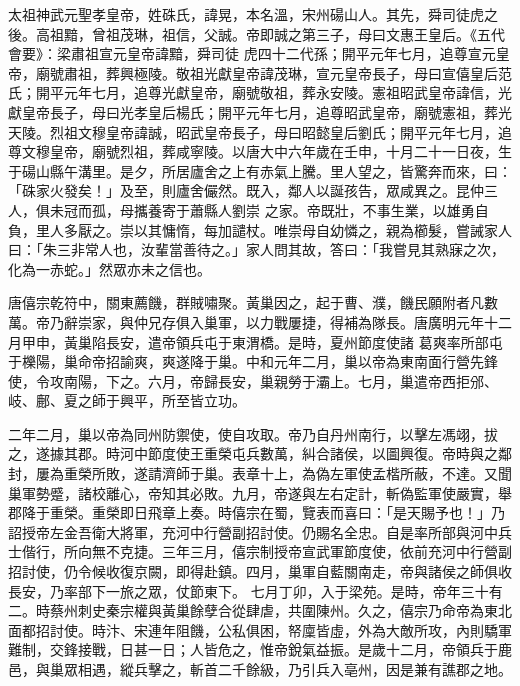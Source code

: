 
\begin{pinyinscope}

 太祖神武元聖孝皇帝，姓硃氏，諱晃，本名溫，宋州碭山人。其先，舜司徒虎之後。高祖黯，曾祖茂琳，祖信，父誠。帝即誠之第三子，母曰文惠王皇后。《五代會要》：梁肅祖宣元皇帝諱黯，舜司徒
 虎四十二代孫；開平元年七月，追尊宣元皇帝，廟號肅祖，葬興極陵。敬祖光獻皇帝諱茂琳，宣元皇帝長子，母曰宣僖皇后范氏；開平元年七月，追尊光獻皇帝，廟號敬祖，葬永安陵。憲祖昭武皇帝諱信，光獻皇帝長子，母曰光孝皇后楊氏；開平元年七月，追尊昭武皇帝，廟號憲祖，葬光天陵。烈祖文穆皇帝諱誠，昭武皇帝長子，母曰昭懿皇后劉氏；開平元年七月，追尊文穆皇帝，廟號烈祖，葬咸寧陵。以唐大中六年歲在壬申，十月二十一日夜，生于碭山縣午溝里。是夕，所居廬舍之上有赤氣上騰。里人望之，皆驚奔而來，曰：「硃家火發矣！」及至，則廬舍儼然。既入，鄰人以誕孩告，眾咸異之。昆仲三人，俱未冠而孤，母攜養寄于蕭縣人劉崇
 之家。帝既壯，不事生業，以雄勇自負，里人多厭之。崇以其慵惰，每加譴杖。唯崇母自幼憐之，親為櫛髮，嘗誡家人曰：「朱三非常人也，汝輩當善待之。」家人問其故，答曰：「我嘗見其熟寐之次，化為一赤蛇。」然眾亦未之信也。



 唐僖宗乾符中，關東薦饑，群賊嘯聚。黃巢因之，起于曹、濮，饑民願附者凡數萬。帝乃辭崇家，與仲兄存俱入巢軍，以力戰屢捷，得補為隊長。唐廣明元年十二月甲申，黃巢陷長安，遣帝領兵屯于東渭橋。是時，夏州節度使諸
 葛爽率所部屯于櫟陽，巢命帝招諭爽，爽遂降于巢。中和元年二月，巢以帝為東南面行營先鋒使，令攻南陽，下之。六月，帝歸長安，巢親勞于灞上。七月，巢遣帝西拒邠、岐、鄜、夏之師于興平，所至皆立功。



 二年二月，巢以帝為同州防禦使，使自攻取。帝乃自丹州南行，以擊左馮翊，拔之，遂據其郡。時河中節度使王重榮屯兵數萬，糾合諸侯，以圖興復。帝時與之鄰封，屢為重榮所敗，遂請濟師于巢。表章十上，為偽左軍使孟楷所蔽，不達。又聞
 巢軍勢蹙，諸校離心，帝知其必敗。九月，帝遂與左右定計，斬偽監軍使嚴實，舉郡降于重榮。重榮即日飛章上奏。時僖宗在蜀，覽表而喜曰：「是天賜予也！」乃詔授帝左金吾衛大將軍，充河中行營副招討使。仍賜名全忠。自是率所部與河中兵士偕行，所向無不克捷。三年三月，僖宗制授帝宣武軍節度使，依前充河中行營副招討使，仍令候收復京闕，即得赴鎮。四月，巢軍自藍關南走，帝與諸侯之師俱收長安，乃率部下一旅之眾，仗節東下。
 七月丁卯，入于梁苑。是時，帝年三十有二。時蔡州刺史秦宗權與黃巢餘孽合從肆虐，共圍陳州。久之，僖宗乃命帝為東北面都招討使。時汴、宋連年阻饑，公私俱困，帑廩皆虛，外為大敵所攻，內則驕軍難制，交鋒接戰，日甚一日；人皆危之，惟帝銳氣益振。是歲十二月，帝領兵于鹿邑，與巢眾相遇，縱兵擊之，斬首二千餘級，乃引兵入亳州，因是兼有譙郡之地。




\end{pinyinscope}
